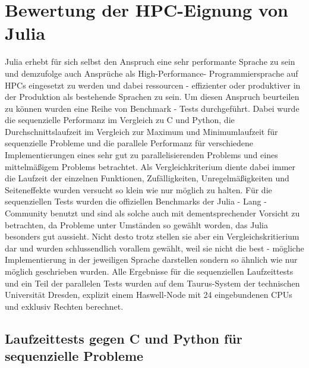 \documentclass[proseminar,german,utf8]{zihpub}
\begin{document}
\section{Bewertung der HPC-Eignung von Julia}
Julia erhebt für sich selbst den Anspruch eine sehr performante Sprache zu sein und demzufolge auch Ansprüche als High-Performance- Programmiersprache auf HPCs eingesetzt zu werden und dabei ressourcen - effizienter oder produktiver in der Produktion als bestehende Sprachen zu sein. Um diesen Anspruch beurteilen zu können wurden eine Reihe von Benchmark - Tests durchgeführt. Dabei wurde die sequenzielle Performanz im Vergleich zu C und Python, die Durchschnittslaufzeit im Vergleich zur Maximum und Minimumlaufzeit für sequenzielle Probleme und die parallele Performanz für verschiedene Implementierungen eines sehr gut zu parallelisierenden Problems und eines mittelmäßigem Problems betrachtet. Als Vergleichkriterium diente dabei immer die Laufzeit der einzelnen Funktionen, Zufälligkeiten, Unregelmäßigkeiten und Seiteneffekte wurden versucht so klein wie nur möglich zu halten. Für die sequenziellen Tests wurden die offiziellen Benchmarks der Julia - Lang - Community benutzt und sind als solche auch mit dementsprechender Vorsicht zu betrachten, da Probleme unter Umständen so gewählt worden, das Julia besonders gut aussieht. Nicht desto trotz stellen sie aber ein Vergleichskritierium dar und wurden schlussendlich vorallem gewählt, weil sie nicht die best - mögliche Implementierung in der jeweiligen Sprache darstellen sondern so ähnlich wie nur möglich geschrieben wurden. Alle Ergebnisse für die sequenziellen Laufzeittests und ein Teil der parallelen Tests wurden auf dem Taurus-System der technischen Universität Dresden, explizit einem Haswell-Node mit 24 eingebundenen CPUs und exklusiv Rechten berechnet. 

\subsection{Laufzeittests gegen C und Python für sequenzielle Probleme}
\end{document}
